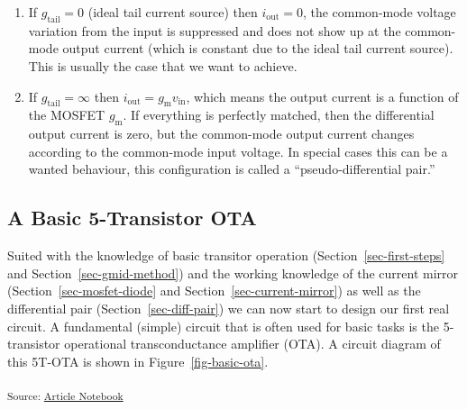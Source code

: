 \documentclass[
  a4paper,
  DIV=11,
  numbers=noendperiod]{scrartcl}
\providecommand{\tightlist}{%
  \setlength{\itemsep}{0pt}\setlength{\parskip}{0pt}}\usepackage{longtable,booktabs,array}
\begin{document}
\begin{enumerate}
\def\labelenumi{\arabic{enumi}.}
\tightlist
\item
  If \(g_\mathrm{tail} = 0\) (ideal tail current source) then
  \(i_\mathrm{out} = 0\), the common-mode voltage variation from the
  input is suppressed and does not show up at the common-mode output
  current (which is constant due to the ideal tail current source). This
  is usually the case that we want to achieve.
\item
  If \(g_\mathrm{tail} = \infty\) then
  \(i_\mathrm{out} = g_\mathrm{m}v_\mathrm{in}\), which means the output
  current is a function of the MOSFET \(g_\mathrm{m}\). If everything is
  perfectly matched, then the differential output current is zero, but
  the common-mode output current changes according to the common-mode
  input voltage. In special cases this can be a wanted behaviour, this
  configuration is called a ``pseudo-differential pair.''
\end{enumerate}

\subsection{A Basic 5-Transistor OTA}\label{sec-basic-ota}

Suited with the knowledge of basic transitor operation
(Section~\ref{sec-first-steps} and Section~\ref{sec-gmid-method}) and
the working knowledge of the current mirror
(Section~\ref{sec-mosfet-diode} and Section~\ref{sec-current-mirror}) as
well as the differential pair (Section~\ref{sec-diff-pair}) we can now
start to design our first real circuit. A fundamental (simple) circuit
that is often used for basic tasks is the 5-transistor operational
transconductance amplifier (OTA). A circuit diagram of this 5T-OTA is
shown in Figure~\ref{fig-basic-ota}.

\textsubscript{Source:
\href{https://iic-jku.github.io/analog-circuit-design/index.qmd.html}{Article
Notebook}}
\end{document}
